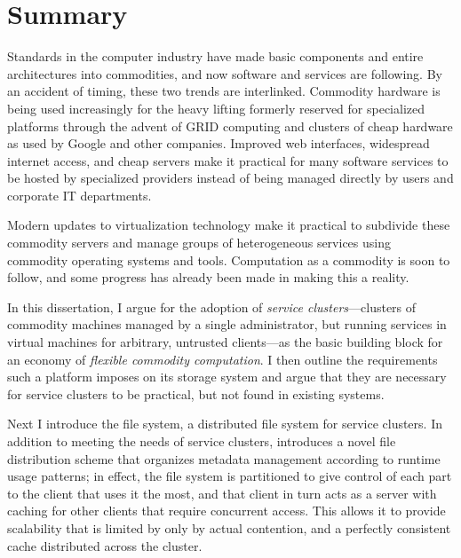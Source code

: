 \chapter*{Summary}

Standards in the computer industry have made basic components and entire architectures into commodities, and now software and services are following. By an accident of timing, these two trends are interlinked. Commodity hardware is being used increasingly for the heavy lifting formerly reserved for specialized platforms through the advent of GRID computing and clusters of cheap hardware as used by Google and other companies. Improved web interfaces, widespread internet access, and cheap servers make it practical for many software services to be hosted by specialized providers instead of being managed directly by users and corporate IT departments.

Modern updates to virtualization technology make it practical to subdivide these commodity servers and manage groups of heterogeneous services using commodity operating systems and tools. Computation as a commodity is soon to follow, and some progress has already been made in making this a reality.

In this dissertation, I argue for the adoption of \emph{service clusters}---clusters of commodity machines managed by a single administrator, but running services in virtual machines for arbitrary, untrusted clients---as the basic building block for an economy of \emph{flexible commodity computation}. I then outline the requirements such a platform imposes on its storage system and argue that they are necessary for service clusters to be practical, but not found in existing systems.

Next I introduce the \envoy file system, a distributed file system for service clusters. In addition to meeting the needs of service clusters, \envoy introduces a novel file distribution scheme that organizes metadata management according to runtime usage patterns; in effect, the file system is partitioned to give control of each part to the client that uses it the most, and that client in turn acts as a server with caching for other clients that require concurrent access. This allows it to provide scalability that is limited by only by actual contention, and a perfectly consistent cache distributed across the cluster.